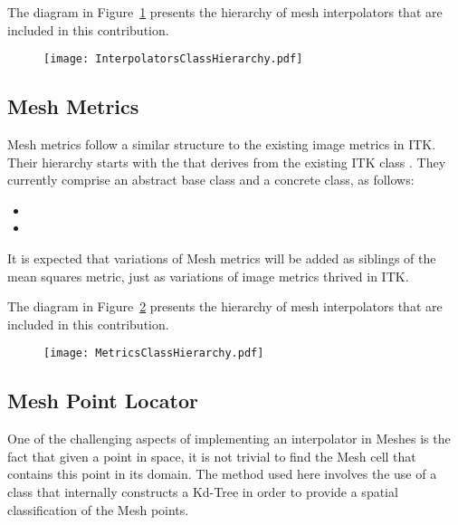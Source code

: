 \documentclass{InsightArticle}
\begin{document}
The diagram in Figure~\ref{fig:InterpolatorsClassHierarchy} presents the hierarchy of mesh
interpolators that are included in this contribution.

\begin{figure}
\center
\texttt{[image: InterpolatorsClassHierarchy.pdf]}
\label{fig:InterpolatorsClassHierarchy}
\end{figure}

\subsection{Mesh Metrics}

Mesh metrics follow a similar structure to the existing image metrics in ITK.
Their hierarchy starts with the  that derives from
the existing ITK class . They currently comprise
an abstract base class and a concrete class, as follows:

\begin{itemize}
\item {}
\item {}
\end{itemize}

It is expected that variations of Mesh metrics will be added as siblings of the
mean squares metric, just as variations of image metrics thrived in ITK.

The diagram in Figure~\ref{fig:MetricsClassHierarchy} presents the hierarchy of mesh
interpolators that are included in this contribution.

\begin{figure}
\center
\texttt{[image: MetricsClassHierarchy.pdf]}
\label{fig:MetricsClassHierarchy}
\end{figure}

\subsection{Mesh Point Locator}

One of the challenging aspects of implementing an interpolator in Meshes is the
fact that given a point in space, it is not trivial to find the Mesh cell that
contains this point in its domain. The method used here involves the use of a
 class that internally constructs a Kd-Tree in order to provide
a spatial classification of the Mesh points.
\end{document}

